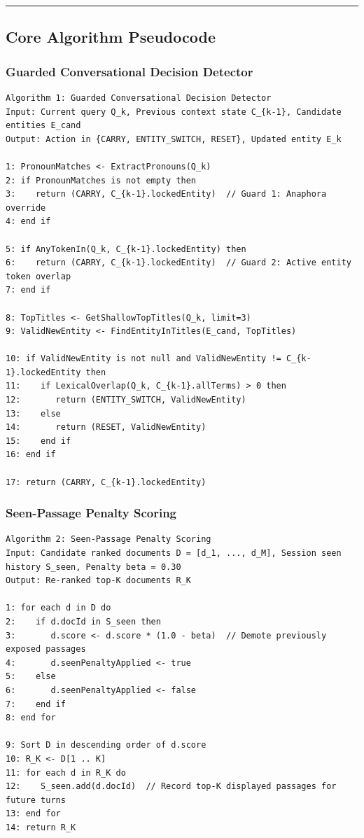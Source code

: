 \documentclass[10pt,a4paper,twocolumn]{article}
\begin{document}
\vspace{10pt}
\hrule
\vspace{10pt}

\subsection{Core Algorithm Pseudocode}
\label{app:algorithms}

\subsubsection{Guarded Conversational Decision Detector}
\begin{verbatim}
Algorithm 1: Guarded Conversational Decision Detector
Input: Current query Q_k, Previous context state C_{k-1}, Candidate entities E_cand
Output: Action in {CARRY, ENTITY_SWITCH, RESET}, Updated entity E_k

1: PronounMatches <- ExtractPronouns(Q_k)
2: if PronounMatches is not empty then
3:    return (CARRY, C_{k-1}.lockedEntity)  // Guard 1: Anaphora override
4: end if

5: if AnyTokenIn(Q_k, C_{k-1}.lockedEntity) then
6:    return (CARRY, C_{k-1}.lockedEntity)  // Guard 2: Active entity token overlap
7: end if

8: TopTitles <- GetShallowTopTitles(Q_k, limit=3)
9: ValidNewEntity <- FindEntityInTitles(E_cand, TopTitles)

10: if ValidNewEntity is not null and ValidNewEntity != C_{k-1}.lockedEntity then
11:    if LexicalOverlap(Q_k, C_{k-1}.allTerms) > 0 then
12:       return (ENTITY_SWITCH, ValidNewEntity)
13:    else
14:       return (RESET, ValidNewEntity)
15:    end if
16: end if

17: return (CARRY, C_{k-1}.lockedEntity)
\end{verbatim}

\subsubsection{Seen-Passage Penalty Scoring}
\begin{verbatim}
Algorithm 2: Seen-Passage Penalty Scoring
Input: Candidate ranked documents D = [d_1, ..., d_M], Session seen history S_seen, Penalty beta = 0.30
Output: Re-ranked top-K documents R_K

1: for each d in D do
2:    if d.docId in S_seen then
3:       d.score <- d.score * (1.0 - beta)  // Demote previously exposed passages
4:       d.seenPenaltyApplied <- true
5:    else
6:       d.seenPenaltyApplied <- false
7:    end if
8: end for

9: Sort D in descending order of d.score
10: R_K <- D[1 .. K]
11: for each d in R_K do
12:    S_seen.add(d.docId)  // Record top-K displayed passages for future turns
13: end for
14: return R_K
\end{verbatim}
\end{document}
